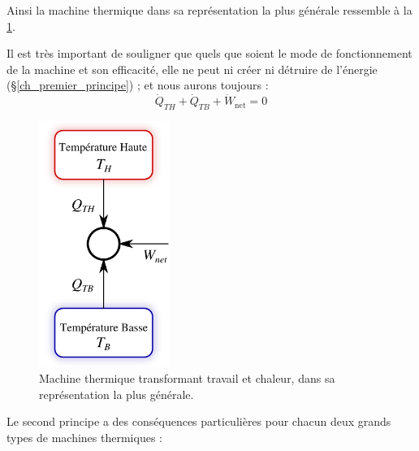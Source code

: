 	Ainsi la machine thermique dans sa représentation la plus générale ressemble à la \cref{fig_conventions_notation_machines_thermiques}.

	Il est très important de souligner que quels que soient le mode de fonctionnement de la machine et son efficacité, elle ne peut ni créer ni détruire de l’énergie (\S\ref{ch_premier_principe}) ; et nous aurons toujours :
	\begin{equation}
		\dot{Q}_{TH} + \dot{Q}_{TB} + \dot{W}_\text{net} = 0
		\label{eq_premier_principe_machines}
	\end{equation}

	\begin{figure}%
		\begin{center}
			\includegraphics[height=8cm]{images/moteur_forme_generale.png}
		\end{center}
		\caption{Machine thermique transformant travail et chaleur, dans sa représentation la plus générale.}
		\label{fig_conventions_notation_machines_thermiques}
	\end{figure}

	\clearfloats
	Le second principe a des conséquences particulières pour chacun deux grands types de machines thermiques :

